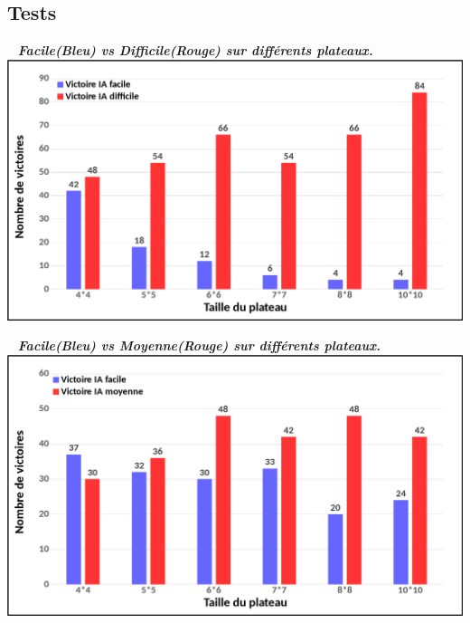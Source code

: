 \documentclass{beamer}
\begin{document}
\subsection{Tests}
\begin{frame}{}
\begin{center}

{
 \hspace*{1cm}~\tiny
 \textbf{\textit{Facile(Bleu) vs Difficile(Rouge) sur différents plateaux.}}
 \newline
 \includegraphics[scale=0.25]{IA10}
}

\end{center}
\end{frame}
\begin{frame}
\begin{center}


{ 
  \hspace*{1cm}~\tiny
 \textbf{\textit{Facile(Bleu) vs Moyenne(Rouge) sur différents plateaux.}}
 \newline
 \includegraphics[scale=0.25]{IA11}
 }
 
\end{center}
\end{frame}
\end{document}

